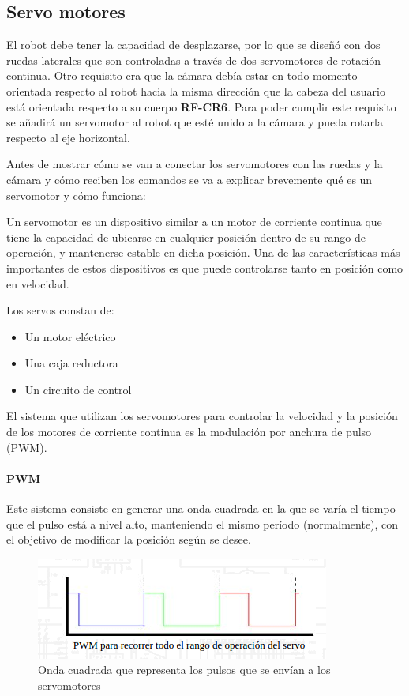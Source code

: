 \documentclass[twoside, 11pt]{epstfg}
\begin{document}
\subsection{Servo motores}
El robot debe tener la capacidad de desplazarse, por lo que se diseñó con dos ruedas laterales que son controladas a través de dos servomotores de rotación continua. Otro requisito era que la cámara debía estar en todo momento orientada respecto al robot hacia la misma dirección que la cabeza del usuario está orientada respecto a su cuerpo \textbf{RF-CR6}. Para poder cumplir este requisito se añadirá un servomotor al robot que esté unido a la cámara y pueda rotarla respecto al eje horizontal.

Antes de mostrar cómo se van a conectar los servomotores con las ruedas y la cámara y cómo reciben los comandos se va a explicar brevemente qué es un servomotor y cómo funciona:

Un servomotor es un dispositivo similar a un motor de corriente continua que tiene la capacidad de ubicarse en cualquier posición dentro de su rango de operación, y mantenerse estable en dicha posición. Una de las características más importantes de estos dispositivos es que puede controlarse tanto en posición como en velocidad.


Los servos constan de:
\begin{itemize}
	\item Un motor eléctrico
	\item Una caja reductora
	\item Un circuito de control
\end{itemize}

El sistema que utilizan los servomotores para controlar la velocidad y la posición de los motores de corriente continua es la modulación por anchura de pulso (PWM).

\paragraph{PWM}

Este sistema consiste en generar una onda cuadrada en la que se varía el tiempo que el pulso está a nivel alto, manteniendo el mismo período (normalmente), con el objetivo de modificar la posición según se desee.

\begin{figure}[h]
	\centerline{
		\mbox{\includegraphics[width=.80\textwidth]{images/ondaServo.png}}
	}
	\caption{Onda cuadrada que representa los pulsos que se envían a los servomotores}
	\label{ondaservo}
\end{figure}
\end{document}
